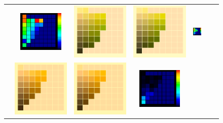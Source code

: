 \begin{figure}[ht!]
{\begin{tabular}{ccccccc}
			& 
			\includegraphics[width=.15\linewidth,height=5.25em]{img/results_uplift_page09_diff_sigmoidFL11.png}
			&\quad
			\includegraphics[width=.15\linewidth]{img/results_uplift_page14_originalFL11.png}
			&
			\includegraphics[width=.15\linewidth]{img/results_uplift_page14_sigmoidFL11.png}
			&
			\includegraphics[width=.15\linewidth,height=5.25em]{img/results_uplift_page14_diff_sigmoidFL11.png}
			\\ \raisebox{0.5cm}[0pt][0pt]{\parbox[c][0pt][c]{0cm}{\hspace{-1.5em}\\[20pt]}\par}
			&
			\includegraphics[width=.15\linewidth]{img/results_uplift_page09_originalFL11.png}
			&
			\includegraphics[width=.15\linewidth]{img/results_uplift_page09_ourFL11.png}
			&
			\includegraphics[width=.15\linewidth,height=5.25em]{img/results_uplift_page09_diff_ourFL11.png}

\end{tabular}}
\end{figure}
